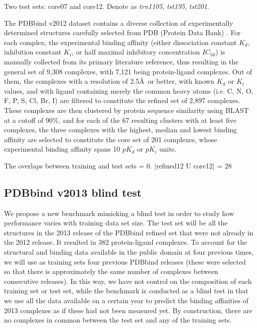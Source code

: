 \documentclass[journal=jacsat,manuscript=article]{achemso}
\begin{document}
Two test sets: core07 and core12. Denote as \textit{trn1105}, \textit{tst195}, \textit{tst201}.

The PDBbind v2012 dataset contains a diverse collection of experimentally determined structures carefully selected from PDB (Protein Data Bank) \cite{540,537}. For each complex, the experimental binding affinity (either dissociation constant $K_d$, inhibition constant $K_i$, or half maximal inhibitory concentration $IC_{50}$) is manually collected from its primary literature reference, thus resulting in the general set of 9,308 complexes, with 7,121 being protein-ligand complexes. Out of them, the complexes with a resolution of 2.5\AA\ or better, with known $K_d$ or $K_i$ values, and with ligand containing merely the common heavy atoms (i.e. C, N, O, F, P, S, Cl, Br, I) are filtered to constitute the refined set of 2,897 complexes. These complexes are then clustered by protein sequence similarity using BLAST at a cutoff of 90\%, and for each of the 67 resulting clusters with at least five complexes, the three complexes with the highest, median and lowest binding affinity are selected to constitute the core set of 201 complexes, whose experimental binding affinity spans 10 $pK_d$ or $pK_i$ units.

The overlaps between training and test sets = 0. |refined12 U core12| = 28

\subsection{PDBbind v2013 blind test}

We propose a new benchmark mimicking a blind test in order to study how performance varies with training data set size. The test set will be all the structures in the 2013 release of the PDBbind refined set that were not already in the 2012 release. It resulted in 382 protein-ligand complexes. To account for the structural and binding data available in the public domain at four previous times, we will use as training sets four previous PDBbind releases (these were selected so that there is approximately the same number of complexes between consecutive releases). In this way, we have not control on the composition of each training set or test set, while the benchmark is conducted as a blind test in that we use all the data available on a certain year to predict the binding affinities of 2013 complexes as if these had not been measured yet. By construction, there are no complexes in common between the test set and any of the training sets. 
\end{document}

